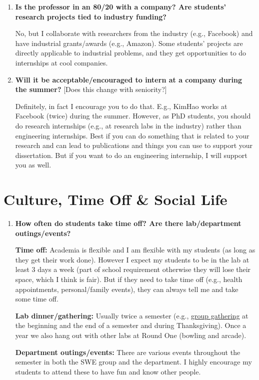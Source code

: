 \documentclass{article}
\begin{document}
\begin{enumerate}[label=\arabic*.]
    \item \textbf{Is the professor in an 80/20 with a company? Are students' research projects tied to industry funding?}  
    
    No, but I collaborate with researchers from the industry (e.g., Facebook) and have industrial grants/awards (e.g., Amazon). Some students' projects are directly applicable to industrial problems, and they get opportunities to do internships at cool companies.

    \item \textbf{Will it be acceptable/encouraged to intern at a company during the summer?} [Does this change with seniority?]  
    
    Definitely, in fact I encourage you to do that. E.g., KimHao works at Facebook (twice) during the summer. However, as PhD students, you should do research internships (e.g., at research labs in the industry) rather than engineering internships. Best if you can do something that is related to your research and can lead to publications and things you can use to support your dissertation. But if you want to do an engineering internship, I will support you as well.

\end{enumerate}

\section{Culture, Time Off \& Social Life}

\begin{enumerate}[label=\arabic*.]
    \item \textbf{How often do students take time off? Are there lab/department outings/events?}  
    
    \textbf{Time off:} Academia is flexible and I am flexible with my students (as long as they get their work done).
    However I expect my students to be in the lab at least 3 days a week (part of school requirement otherwise they will lose their space, which I think is fair).  But if they need to take time off (e.g., health appointments, personal/family events), they can always tell me and take some time off.  
    
    \textbf{Lab dinner/gathering:} Usually twice a semester (e.g., \href{https://photos.google.com/share/AF1QipNMHIvnSmq5bjer6I6r1Ddb4yiBt3jgq4yrA7q5lSmo4ePHfmiXhXqhk8IhKf47lA?key=SkJhMjZtYmoyT1Q2aW1ERGpRa2VTclZrbzJVLUpR}{group gathering} at the beginning and the end of a semester and during Thanksgiving). Once a year we also hang out with other labs at Round One (bowling and arcade).  
    
    \textbf{Department outings/events:} There are various events throughout the semester in both the SWE group and the department. I highly encourage my students to attend these to have fun and know other people.
\end{enumerate}
\end{document}
